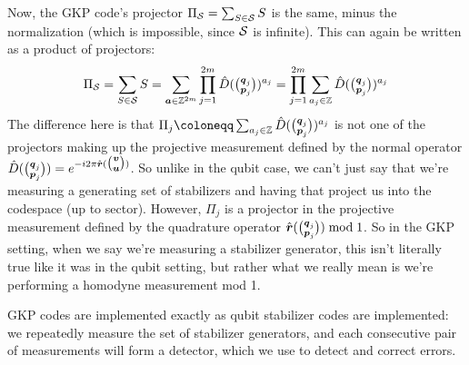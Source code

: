 Now, the GKP code's projector $\Pi_{\mathcal{S}} = \sum_{S \in \mathcal{S}} S$ is the same, minus the normalization (which is impossible, since $\mathcal{S}$ is infinite).
This can again be written as a product of projectors:
\begin{equation}\label{eq:GKP_codespace_projector}
    \Pi_{\mathcal{S}}
    = \sum_{S \in \mathcal{S}} S
    = \sum_{\boldsymbol{a} \in \mathbb{Z}^{2m}} \prod_{j=1}^{2m} \hat{D}(\tbinom{\boldsymbol{q}_j}{\boldsymbol{p}_j})^{a_j}
    = \prod_{j=1}^{2m} \sum_{a_j \in \mathbb{Z}} \hat{D}(\tbinom{\boldsymbol{q}_j}{\boldsymbol{p}_j})^{a_j}
\end{equation}
The difference here is that $\Pi_j \coloneqq \sum_{a_j \in \ZZ} \hat{D}(\tbinom{\bsym{q}_j}{\bsym{p}_j})^{a_j}$ is not one of the projectors making up the projective measurement defined by the normal operator $\hat{D}(\tbinom{\boldsymbol{q}_j}{\boldsymbol{p}_j}) = e^{-i2\pi \hat{\boldsymbol{r}}(\tbinom{\boldsymbol{v}}{\boldsymbol{u}})}$.
So unlike in the qubit case, we can't just say that we're measuring a generating set of stabilizers and having that project us into the codespace (up to sector).
However, $\Pi_j$ is a projector in the projective measurement defined by the quadrature operator $\hat{\boldsymbol{r}}(\tbinom{\boldsymbol{q}_j}{\boldsymbol{p}_j}) \bmod 1$.
So in the GKP setting, when we say we're measuring a stabilizer generator, this isn't literally true like it was in the qubit setting, but rather what we really mean is we're performing a homodyne measurement mod 1.

GKP codes are implemented exactly as qubit stabilizer codes are implemented: we repeatedly measure the set of stabilizer generators, and each consecutive pair of measurements will form a detector, which we use to detect and correct errors.







